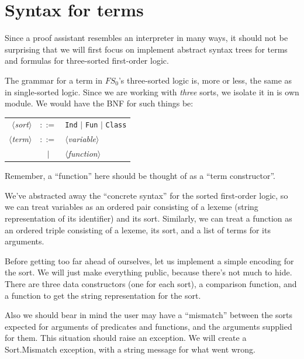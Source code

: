 
\section{Syntax for terms}

\begin{node}
Since a proof assistant resembles an interpreter in many ways, it
should not be surprising that we will first focus on implement
abstract syntax trees for terms and formulas for three-sorted
first-order logic. 
\end{node}

\begin{node}
The grammar for a term in $FS_{0}$'s three-sorted logic is, more or
less, the same as in single-sorted logic. Since we are working with
\emph{three} sorts, we isolate it in is own module. We would have the
BNF for such things be:
\begin{center}
\begin{tabular}{rcl}
$\langle$\textit{sort}$\rangle$ & $::=$ & \texttt{Ind} $\mid$ \texttt{Fun} $\mid$ \texttt{Class}\\
$\langle$\textit{term}$\rangle$ & $::=$ & $\langle$\textit{variable}$\rangle$ \\
& $\mid$ & $\langle$\textit{function}$\rangle$
\end{tabular}
\end{center}
Remember, a ``function'' here should be thought of as a ``term constructor''.

We've abstracted away the ``concrete syntax'' for the sorted
first-order logic, so we can treat variables as an ordered pair
consisting of a lexeme (string representation of its identifier) and
its sort. Similarly, we can treat a function as an ordered triple
consisting of a lexeme, its sort, and a list of terms for its
arguments.

Before getting too far ahead of ourselves, let us implement a simple
encoding for the sort. We will just make everything public, because
there's not much to hide. There are three data constructors (one for
each sort), a comparison function, and a function to get the string
representation for the sort.

Also we should bear in mind the user may have a ``mismatch'' between
the sorts expected for arguments of predicates and functions, and the
arguments supplied for them. This situation should raise an
exception. We will create a {\Tt{}Sort.Mismatch\nwendquote} exception, with a string
message for what went wrong.
\end{node}

